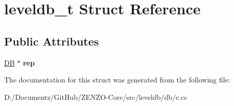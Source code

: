 \hypertarget{structleveldb__t}{}\section{leveldb\+\_\+t Struct Reference}
\label{structleveldb__t}
\subsection*{Public Attributes}
\begin{DoxyCompactItemize}
\item 
\mbox{\label{structleveldb__t_af8f1950b2c676ccc37e4095f558261ad}} 
\mbox{\hyperlink{classleveldb_1_1_d_b}{DB}} $\ast$ {\bfseries rep}
\end{DoxyCompactItemize}


The documentation for this struct was generated from the following file\+:\begin{DoxyCompactItemize}
\item 
D\+:/\+Documentz/\+Git\+Hub/\+Z\+E\+N\+Z\+O-\/\+Core/src/leveldb/db/c.\+cc\end{DoxyCompactItemize}
